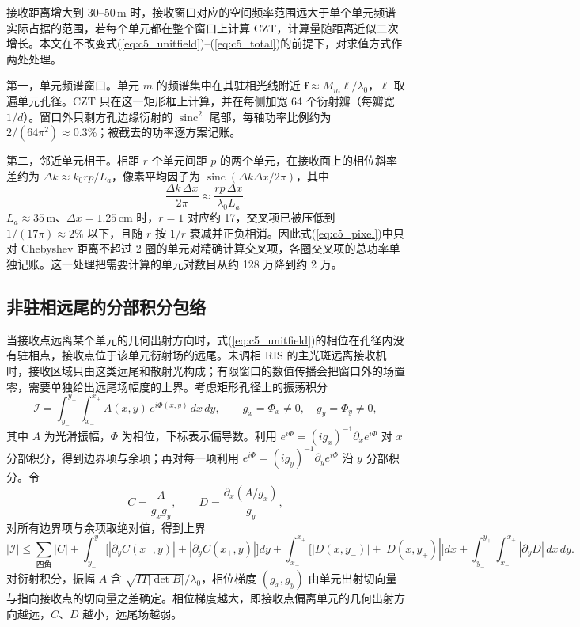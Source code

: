 接收距离增大到 30--50\,m 时，接收窗口对应的空间频率范围远大于单个单元频谱实际占据的范围，若每个单元都在整个窗口上计算 CZT，计算量随距离近似二次增长。本文在不改变式(\ref{eq:c5_unitfield})--(\ref{eq:c5_total})的前提下，对求值方式作两处处理。

第一，单元频谱窗口。单元 $m$ 的频谱集中在其驻相光线附近 $\mathbf f\approx M_m\boldsymbol\ell/\lambda_0$，$\boldsymbol\ell$ 取遍单元孔径。CZT 只在这一矩形框上计算，并在每侧加宽 64 个衍射瓣（每瓣宽 $1/d$）。窗口外只剩方孔边缘衍射的 $\operatorname{sinc}^2$ 尾部，每轴功率比例约为 $2/(64\pi^2)\approx0.3\%$；被截去的功率逐方案记账。

第二，邻近单元相干。相距 $r$ 个单元间距 $p$ 的两个单元，在接收面上的相位斜率差约为 $\Delta k\approx k_0rp/L_a$，像素平均因子为 $\operatorname{sinc}(\Delta k\Delta x/2\pi)$，其中
\begin{equation}
\frac{\Delta k\,\Delta x}{2\pi}\approx\frac{rp\,\Delta x}{\lambda_0L_a}.
\label{eq:c4_ring}
\end{equation}
$L_a\approx35\,\mathrm m$、$\Delta x=1.25\,\mathrm{cm}$ 时，$r=1$ 对应约 17，交叉项已被压低到 $1/(17\pi)\approx2\%$ 以下，且随 $r$ 按 $1/r$ 衰减并正负相消。因此式(\ref{eq:c5_pixel})中只对 Chebyshev 距离不超过 2 圈的单元对精确计算交叉项，各圈交叉项的总功率单独记账。这一处理把需要计算的单元对数目从约 128 万降到约 2 万。

\subsection{非驻相远尾的分部积分包络}
\label{sec:c4_tail}

当接收点远离某个单元的几何出射方向时，式(\ref{eq:c5_unitfield})的相位在孔径内没有驻相点，接收点位于该单元衍射场的远尾。未调相 RIS 的主光斑远离接收机时，接收区域只由这类远尾和散射光构成；有限窗口的数值传播会把窗口外的场置零，需要单独给出远尾场幅度的上界。考虑矩形孔径上的振荡积分
\begin{equation}
\mathcal I=\int_{y_-}^{y_+}\int_{x_-}^{x_+}A(x,y)\,e^{i\Phi(x,y)}\,dx\,dy,\qquad
g_x=\Phi_x\ne0,\quad g_y=\Phi_y\ne0,
\label{eq:appA_int}
\end{equation}
其中 $A$ 为光滑振幅，$\Phi$ 为相位，下标表示偏导数。利用 $e^{i\Phi}=(ig_x)^{-1}\partial_xe^{i\Phi}$ 对 $x$ 分部积分，得到边界项与余项；再对每一项利用 $e^{i\Phi}=(ig_y)^{-1}\partial_ye^{i\Phi}$ 沿 $y$ 分部积分。令
\begin{equation}
C=\frac{A}{g_xg_y},\qquad D=\frac{\partial_x(A/g_x)}{g_y},
\label{eq:appA_CD}
\end{equation}
对所有边界项与余项取绝对值，得到上界
\begin{equation}
|\mathcal I|\le\sum_{\text{四角}}|C|
+\int_{y_-}^{y_+}\big[|\partial_yC(x_-,y)|+|\partial_yC(x_+,y)|\big]dy
+\int_{x_-}^{x_+}\big[|D(x,y_-)|+|D(x,y_+)|\big]dx
+\int_{y_-}^{y_+}\!\!\int_{x_-}^{x_+}|\partial_yD|\,dx\,dy.
\label{eq:appA_bound}
\end{equation}
对衍射积分，振幅 $A$ 含 $\sqrt{IT|\det B|}/\lambda_0$，相位梯度 $(g_x,g_y)$ 由单元出射切向量与指向接收点的切向量之差确定。相位梯度越大，即接收点偏离单元的几何出射方向越远，$C$、$D$ 越小，远尾场越弱。


